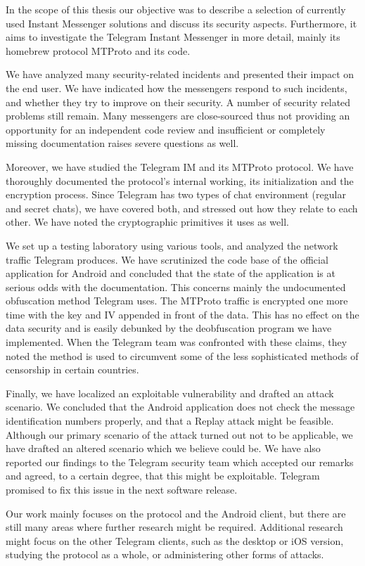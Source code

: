 \documentclass[thesis=M,english]{FITthesis}[2012/10/20]
\begin{document}
\begin{conclusion}

In the scope of this thesis our objective was to describe a selection of currently used Instant Messenger solutions and discuss its security aspects. Furthermore, it aims to investigate the Telegram Instant Messenger in more detail, mainly its homebrew protocol MTProto and its code.

We have analyzed many security-related incidents and presented their impact on the end user. We have indicated how the messengers respond to such incidents, and whether they try to improve on their security. A number of security related problems still remain. Many messengers are close-sourced thus not providing an opportunity for an independent code review and insufficient or completely missing documentation raises severe questions as well.

Moreover, we have studied the Telegram IM and its MTProto protocol. We have thoroughly documented the protocol's internal working, its initialization and the encryption process. Since Telegram has two types of chat environment (regular and secret chats), we have covered both, and stressed out how they relate to each other. We have noted the cryptographic primitives it uses as well.

We set up a testing laboratory using various tools, and analyzed the network traffic Telegram produces. We have scrutinized the code base of the official application for Android and concluded that the state of the application is at serious odds with the documentation. This concerns mainly the undocumented obfuscation method Telegram uses. The MTProto traffic is encrypted one more time with the key and IV appended in front of the data. This has no effect on the data security and is easily debunked by the deobfuscation program we have implemented. When the Telegram team was confronted with these claims, they noted the method is used to circumvent some of the less sophisticated methods of censorship in certain countries.

Finally, we have localized an exploitable vulnerability and drafted an attack scenario. We concluded that the Android application does not check the message identification numbers properly, and that a Replay attack might be feasible. Although our primary scenario of the attack turned out not to be applicable, we have drafted an altered scenario which we believe could be. We have also reported our findings to the Telegram security team which accepted our remarks and agreed, to a certain degree, that this might be exploitable. Telegram promised to fix this issue in the next software release.

Our work mainly focuses on the protocol and the Android client, but there are still many areas where further research might be required. Additional research might focus on the other Telegram clients, such as the desktop or iOS version, studying the protocol as a whole, or administering other forms of attacks.


\end{conclusion}
\end{document}
